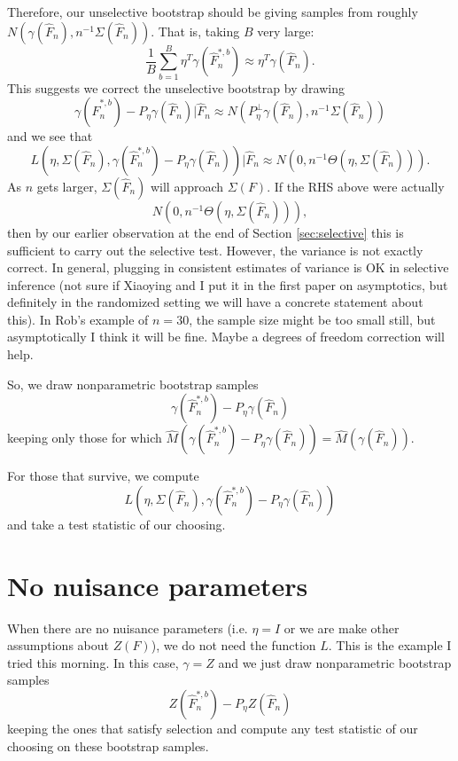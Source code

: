 \documentclass{article}
\begin{document}
Therefore, our unselective bootstrap should be giving samples from
roughly $ N(\gamma(\hat{F}_n), n^{-1} \Sigma(\hat{F}_n))$. That is,
taking $B$ very large:
$$
\frac{1}{B}\sum_{b=1}^B \eta^T \gamma(\hat{F}^{*,b}_n) \approx \eta^T\gamma(\hat{F}_n).
$$
This suggests we correct the unselective bootstrap by drawing
$$
\gamma(\hat{F}^{*,b}_n) - P_{\eta}\gamma(\hat{F}_n) | \hat{F}_n \approx N(P_{\eta}^{\perp}\gamma(\hat{F}_n) ,n^{-1} \Sigma(\hat{F}_n))
$$
and we see that
$$
L(\eta, \Sigma(\hat{F}_n), \gamma(\hat{F}^{*,b}_n) - P_{\eta} \gamma(\hat{F}_n)) \big \vert \hat{F}_n
 \approx N(0 ,n^{-1} \Theta(\eta, \Sigma(\hat{F}_n))).
$$
As $n$ gets larger, $\Sigma(\hat{F}_n)$ will approach $\Sigma(F)$. 
If the RHS above were actually $$N(0 ,n^{-1} \Theta(\eta, \Sigma(\hat{F}_n))),$$ then
by our earlier observation at the end of Section \ref{sec:selective} this is sufficient to carry out the selective test.
However, the variance is not exactly correct. In general,
plugging in consistent estimates of variance is OK in selective inference (not sure
if Xiaoying and I put it in the first paper on asymptotics, but definitely in the
randomized setting we will have a concrete statement about this). In Rob's example of $n=30$, the sample size might be too small still, but asymptotically
I think it will be fine. Maybe a degrees of freedom correction will help.

So,
we draw nonparametric bootstrap samples
$$
\gamma(\hat{F}^{*,b}_n) - P_{\eta}\gamma(\hat{F}_n)
$$
keeping only those for which $\hat{M}(\gamma(\hat{F}^{*,b}_n) - P_{\eta}\gamma(\hat{F}_n)) = \hat{M}(\gamma(\hat{F}_n))$.

For those that survive, we compute
$$
L(\eta, \Sigma(\hat{F}_n), \gamma(\hat{F}^{*,b}_n) - P_{\eta}\gamma(\hat{F}_n))
$$
and take a test statistic of our choosing.

\section{No nuisance parameters}

When there are no nuisance parameters (i.e. $\eta=I$ or we are make other assumptions about $Z(F)$), we do not need the
function $L$. This is the example I tried this morning. In this
case, $\gamma=Z$ and we just draw nonparametric bootstrap samples
$$
Z(\hat{F}^{*,b}_n) - P_{\eta}Z(\hat{F}_n)
$$
keeping the ones that satisfy selection and compute any test statistic of our 
choosing on these bootstrap samples. 
\end{document}
